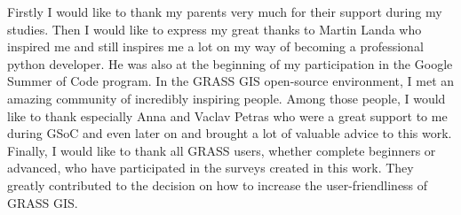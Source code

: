 \documentclass[a4paper,10pt,twoside]{article}
\begin{document}
Firstly I would like to thank my parents very much for their support during my studies. Then I would like to express my great thanks to Martin Landa who inspired me and still inspires me a lot on my way of becoming a professional python developer. He was also at the beginning of my participation in the Google Summer of Code program. In the GRASS GIS open-source environment, I met an amazing community of incredibly inspiring people. Among those people, I would like to thank especially Anna and Vaclav Petras who were a great support to me during GSoC and even later on and brought a lot of valuable advice to this work. Finally, I would like to thank all GRASS users, whether complete beginners or advanced, who have participated in the surveys created in this work. They greatly contributed to the decision on how to increase the user-friendliness of GRASS GIS.


\newpage ~ \newpage
\thispagestyle{empty}


\newpage

\tableofcontents %
\newpage
\listoffigures %

\thispagestyle{empty}
\newcommand{\obrazek}[1]{(viz obr. \ref{#1})} %

\newpage
\pagestyle{fancy}


\renewcommand{\sectionmark}[1]{\markright{\ #1}}

\fancyhf{} %
\renewcommand{\headrulewidth}{0.4pt} %
\renewcommand{\footrulewidth}{0.4pt}  %
\addtolength{\voffset}{-0.4cm}

\fancyhead[RE, RO]{\nouppercase{\rightmark}}
   
\fancyfoot[RO, LE]{{\textsc{\small \thepage}}}

\fancypagestyle{plain}{
  \fancyhead{} %
  \renewcommand{\headrulewidth}{0pt} %
}
\end{document}
